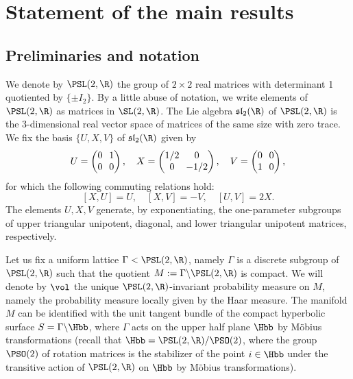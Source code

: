 \section{Statement of the main results}\label{sec:statement}

\subsection{Preliminaries and notation}

We denote by $\PSL(2,\R)$ the group of $2 \times 2$ real matrices with determinant 1 quotiented by $\{\pm I_2\}$.
By a little abuse of notation, we write elements of $\PSL(2,\R)$ as matrices in $\SL(2,\R)$.
The Lie algebra $\mathfrak{sl}_2(\R)$ of $\PSL(2,\R)$ is the 3-dimensional real vector space of matrices of the same size with zero trace.
We fix the basis $\{ U,X,V \}$ of $\mathfrak{sl}_2(\R)$ given by\vspace*{-3pt}
\[\arraycolsep3.5pt
U =
\begin{pmatrix}
0 & 1 \\
0 & 0
\end{pmatrix},
\ \ \
X =
\begin{pmatrix}
1/2 & 0 \\
0 & -1/2
\end{pmatrix},
\ \ \
V =
\begin{pmatrix}
0 & 0 \\
1 & 0
\end{pmatrix},
\]
for which the following commuting relations hold:\vspace*{-3pt}
\[
[X,U] = U, \quad [X,V] = -V, \quad [U,V]= 2X.
\]
The elements $U, X, V$ generate, by exponentiating, the one-parameter subgroups of upper triangular unipotent, diagonal, and lower triangular unipotent matrices, respectively.

Let us fix a uniform lattice $\Gamma < \PSL(2,\R)$, namely $\Gamma$ is a discrete subgroup of $\PSL(2,\R)$ such that the quotient $M := \Gamma \backslash \PSL(2,\R)$ is compact.
We will denote by $\vol$ the unique $\PSL(2,\R)$-invariant probability measure on $M$, namely the probability measure locally given by the Haar measure.
The manifold $M$ can be identified with the unit tangent bundle of the compact hyperbolic surface $S = \Gamma \backslash \Hbb$, where $\Gamma$ acts on the upper half plane $\Hbb$ by Möbius transformations (recall that $\Hbb = \PSL(2,\R) / \PSO(2)$, where the group $\PSO(2)$ of rotation matrices is the stabilizer of the point $i \in \Hbb$ under the transitive action of $\PSL(2,\R)$ on $\Hbb$ by Möbius transformations).

